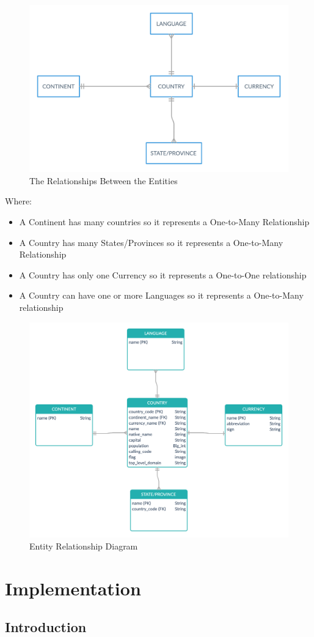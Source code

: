 \documentclass[twoside, a4paper, 12pt]{report}
\begin{document}
\begin{figure} [h]
	\centering
	\includegraphics[width=1.0\textwidth]{relationships.png}
	\caption{The Relationships Between the Entities}
	\label{fig:relationships}
\end{figure}

Where:
\begin{itemize}
	\item A Continent has many countries so it represents a One-to-Many Relationship
	\item A Country has many States/Provinces so it represents a One-to-Many Relationship
	\item A Country has only one Currency so it represents a One-to-One relationship
	\item A Country can have one or more Languages so it represents a One-to-Many relationship
\end{itemize}

\begin{figure} [h]
	\centering
	\includegraphics[width=1.0\textwidth]{ERD.png}
	\caption{Entity Relationship Diagram}
	\label{fig:ERD}
\end{figure}

\chapter{Implementation}
\section{Introduction}

\printbibliography
\end{document}
